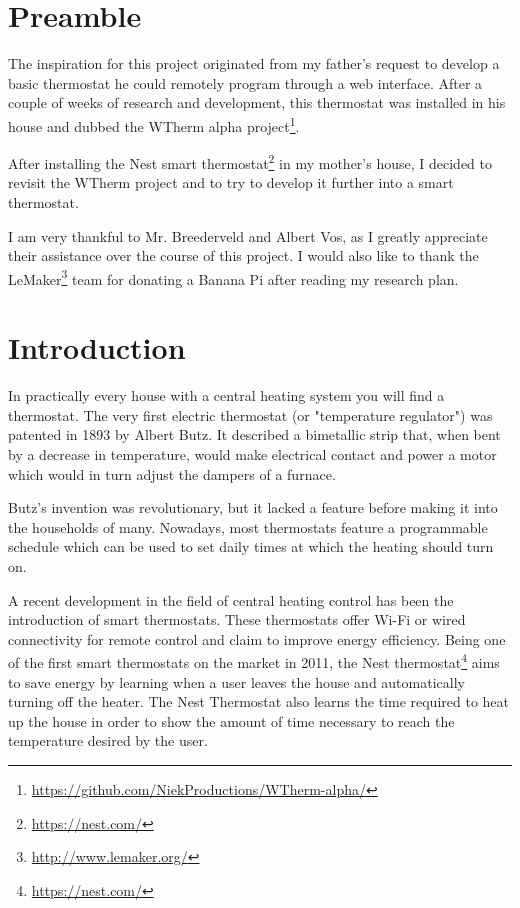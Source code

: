 \documentclass[12pt,a4paper,final]{report}
\begin{document}
\setcounter{tocdepth}{1}
\tableofcontents

\part*{Preamble}
{}
The inspiration for this project originated from my father's request to develop a basic thermostat he could remotely program through a web interface. After a couple of weeks of research and development, this thermostat was installed in his house and dubbed the WTherm alpha project\footnote{\url{https://github.com/NiekProductions/WTherm-alpha/}}. 

After installing the Nest smart thermostat\footnote{\url{https://nest.com/}} in my mother's house, I decided to revisit the WTherm project and to try to develop it further into a smart thermostat.

I am very thankful to Mr. Breederveld and Albert Vos, as I greatly appreciate their assistance over the course of this project.
I would also like to thank the LeMaker\footnote{\url{http://www.lemaker.org/}} team for donating a Banana Pi after reading my research plan.
\newpage

\part*{Introduction}
{}
In practically every house with a central heating system you will find a thermostat. The very first electric thermostat (or "temperature regulator") was patented in 1893 by Albert Butz. It described a bimetallic strip that, when bent by a decrease in temperature, would make electrical contact and power a motor which would in turn adjust the dampers of a furnace\cite{Butz1893Temperature}.

Butz's invention was revolutionary, but it lacked a feature before making it into the households of many. Nowadays, most thermostats feature a programmable schedule which can be used to set daily times at which the heating should turn on.

A recent development in the field of central heating control has been the introduction of smart thermostats. These thermostats offer Wi-Fi or wired connectivity for remote control and claim to improve energy efficiency. Being one of the first smart thermostats on the market in 2011, the Nest thermostat\footnote{\url{https://nest.com/}} aims to save energy by learning when a user leaves the house and automatically turning off the heater. The Nest Thermostat also learns the time required to heat up the house in order to show the amount of time necessary to reach the temperature desired by the user\cite{NestInsideOut}.
\end{document}
